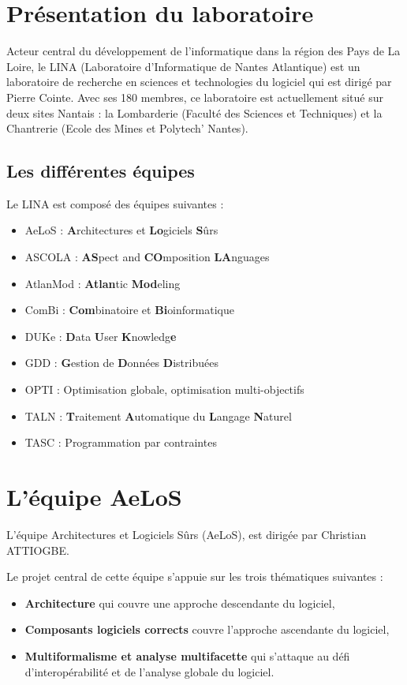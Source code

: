 \documentclass[12pt,a4paper]{report}
\begin{document}
\chapter{Présentation du laboratoire}
Acteur central du développement de l'informatique dans la région des Pays de La Loire, le LINA (Laboratoire d'Informatique de Nantes Atlantique) est un laboratoire de recherche en sciences et technologies du logiciel qui est dirigé par Pierre Cointe. Avec ses 180 membres, ce laboratoire est actuellement situé sur deux sites Nantais : la Lombarderie (Faculté des Sciences et Techniques) et la Chantrerie (Ecole des Mines et Polytech' Nantes).


\section{Les différentes équipes}
Le LINA est composé des équipes suivantes : 
\begin{itemize}
  \item AeLoS : \textbf{A}rchitectures et \textbf{Lo}giciels \textbf{S}ûrs
  \item ASCOLA : \textbf{AS}pect and \textbf{CO}mposition \textbf{LA}nguages
  \item AtlanMod : \textbf{Atlan}tic \textbf{Mod}eling 
  \item ComBi : \textbf{Com}binatoire et \textbf{Bi}oinformatique
  \item DUKe : \textbf{D}ata \textbf{U}ser \textbf{K}nowledg\textbf{e}
  \item GDD : \textbf{G}estion de \textbf{D}onnées \textbf{D}istribuées
  \item OPTI : Optimisation globale, optimisation multi-objectifs
  \item TALN : \textbf{T}raitement \textbf{A}utomatique du \textbf{L}angage \textbf{N}aturel
  \item TASC : Programmation par contraintes
\end{itemize}

\chapter{L'équipe AeLoS}	

L'équipe Architectures et Logiciels Sûrs (AeLoS), est dirigée par Christian ATTIOGBE.

Le projet central de cette équipe s'appuie sur les trois thématiques suivantes :
\begin{itemize}[label=$\circ$]
  \item \textbf{Architecture} qui couvre une approche descendante du logiciel,
  \item \textbf{Composants logiciels corrects} couvre l'approche ascendante du logiciel,
  \item \textbf{Multiformalisme et analyse multifacette} qui s'attaque au défi d'interopérabilité et de l'analyse globale du logiciel.
\end{itemize}
\end{document}
